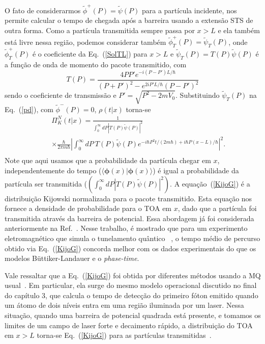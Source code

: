 O fato de considerarmos ${\tilde \phi}^+(P)={\tilde \psi}(P)$ para a partícula incidente, nos permite calcular o tempo de chegada após a barreira usando a extensão STS de outra forma. Como a partícula transmitida sempre passa por $x>L$ e ela também está livre nessa região, podemos considerar também ${\tilde \phi}^+_T(P)={\tilde \psi}_{T}( P)$, onde ${\tilde \phi}^+_T(P)$ é o coeficiente da Eq.~(\ref{SolTL}) para $x>L$ e ${\tilde \psi}_T(P )=T(P){\tilde \psi}(P)$ é a função de onda de momento do pacote transmitido, com
\begin{equation}\label{Trans}
    T(P) = \frac{4 P P' e^{-i(P - P')L/\hbar}}{\left(P + P' \right)^2 - e^{2 iP'L/\hbar} \left(P - P' \right)^2}
\end{equation}
sendo o coeficiente de transmissão e $P'=\sqrt{P^2-2mV_0}$. Substituindo ${\tilde \psi}_{T}(P)$ na Eq.~(\ref{pd}), com ${\tilde \phi}^-(P)=0$, $\rho(t| x)$ torna-se
\begin{eqnarray}\label{KijoG}
    &&\Pi_{K}^{N} (t|x) = \frac{1}{\int_0^\infty dP |T(P){\tilde \psi}(P)|^2}
    \nonumber\\
    &&\times\frac{\hbar}{2 \pi m \hbar} \left| \int_0^\infty dP~T(P){\tilde \psi}(P) e^{-i \hbar P^2 t / (2m\hbar) + i \hbar P (x-L)/\hbar}  \right|^2.\nonumber\\
\end{eqnarray}
Note que aqui usamos que a probabilidade da partícula chegar em $x$, independentemente do tempo (${\langle \pmb{\phi}(x)|\pmb{\phi}(x) \rangle}$) é igual a probabilidade da partícula ser transmitida ($( \int_0^\infty dP |T(P){\tilde \psi}(P)|^2)$. A equação~(\ref{KijoG}) é a distribuição Kijowski normalizada para o pacote transmitido. Esta equação nos fornece a densidade de probabilidade para o TOA em $x$, dado que a partícula foi transmitida através da barreira de potencial. Essa abordagem já foi considerada anteriormente na Ref.~\cite{Ricardo}. Nesse trabalho, é mostrado que para um experimento eletromagnético que simula o tunelamento quântico~ \cite{Ranfa}, o tempo médio de percurso obtido via Eq.~(\ref{KijoG}) concorda melhor com os dados experimentais do que os modelos Büttiker-Landauer e o \textit{phase-time}.




Vale ressaltar que a Eq.~(\ref{KijoG}) foi obtida por diferentes métodos usando a MQ usual~\cite{Delgado,Leon,Baute2}. Em particular, ela surge do mesmo modelo operacional discutido no final do capítulo 3, que calcula o tempo de detecção do primeiro fóton emitido quando um átomo de dois níveis entra em uma região iluminada por um laser. Nessa situação, quando uma barreira de potencial quadrada está presente, e tomamos os limites de um campo de laser forte e decaimento rápido, a distribuição do TOA em $x>L$ torna-se Eq.~(\ref{KijoG}) para as partículas transmitidas~\cite{ Heger2}. 


